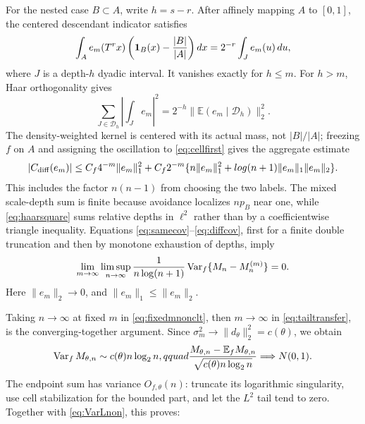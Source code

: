 \documentclass[11pt]{article}
\numberwithin{equation}{section}
\theoremstyle{definition}\newtheorem{definition}[theorem]{Definition}
\theoremstyle{remark}\newtheorem{remark}[theorem]{Remark}
\newcommand{\E}{\mathbb E}\newcommand{\Pp}{\mathbb P}
\newcommand{\Var}{\operatorname {Var}}\newcommand{\Cov}{\operatorname {Cov}}
\newcommand{\1}{\mathbf 1}\newcommand{\cD}{\mathcal D}
\begin{document}
For the nested case $B\subset A$, write $h=s-r$.  After affinely mapping
$A$ to $[0,1]$, the centered descendant indicator satisfies
\begin{equation}
 \int_A e_m(T^rx)\left(\mathbf1_B(x)-{|B|\over|A|}\right)dx
 =2^{-r}\int_J e_m(u)\,du,                                \label{eq:nestedhaar}
\end{equation}
where $J$ is a depth-$h$ dyadic interval.  It vanishes exactly for $h\le m$.
For $h>m$, Haar orthogonality gives
\begin{equation}
 \sum_{J\in\mathcal D_h}\left|\int_J e_m\right|^2
   =2^{-h}\|\E(e_m\mid\mathcal D_h)\|_2^2.              \label{eq:haarsquare}
\end{equation}
The density-weighted kernel is centered with its actual mass, not $|B|/|A|$;
freezing $f$ on $A$ and assigning the oscillation to
\eqref{eq:cellfirst} gives the aggregate estimate
\begin{equation}
 |C_{\rm diff}(e_m)|\le C_f4^{-m}\|e_m\|_1^2+
 C_f2^{-m}\{n\|e_m\|_1^2+log(n+1)\|e_m\|_1\|e_m\|_2\}.
                                                               \label{eq:diffcov}
\end{equation}
This includes the factor $n(n-1)$ from choosing the two labels.  The mixed
scale-depth sum is finite because avoidance localizes $n p_B$ near one,
while \eqref{eq:haarsquare} sums relative depths in $\ell^2$ rather than by
a coefficientwise triangle inequality.  Equations
\eqref{eq:samecov}--\eqref{eq:diffcov}, first for a finite double truncation
and then by monotone exhaustion of depths, imply
\begin{equation}
 \lim_{m\to\infty}\limsup_{n\to\infty}{1\over n\log(n+1)}
 \Var_f\{M_n-M_n^{(m)}\}=0.                              \label{eq:tailtransfer}
\end{equation}
Here $\|e_m\|_2\to0$, and $\|e_m\|_1\le\|e_m\|_2$.

Taking $n\to\infty$ at fixed $m$ in \eqref{eq:fixedmnonclt}, then
$m\to\infty$ in \eqref{eq:tailtransfer}, is the converging-together
argument.  Since $\sigma_m^2\to\|d_\theta\|_2^2=c(\theta)$, we obtain
\begin{equation}
 \Var_fM_{\theta,n}\sim c(\theta)n\log_2n,qquad
 {M_{\theta,n}-\E_fM_{\theta,n}\over\sqrt{c(\theta)n\log_2n}}
 \Longrightarrow N(0,1).                                  \label{eq:Mnonuniform}
\end{equation}
The endpoint sum has variance $O_{f,\theta}(n)$: truncate its logarithmic
singularity, use cell stabilization for the bounded part, and let the
$L^2$ tail tend to zero.  Together with \eqref{eq:VarLnon}, this proves:
\end{document}
